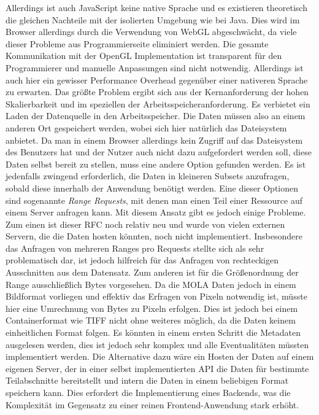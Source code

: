 Allerdings ist auch JavaScript keine native Sprache und es existieren theoretisch die gleichen Nachteile mit der isolierten Umgebung wie bei Java. Dies wird im Browser allerdings durch die Verwendung von WebGL abgeschwächt, da viele dieser Probleme aus Programmierseite eliminiert werden. Die gesamte Kommunikation mit der OpenGL Implementation ist transparent für den Programmierer und manuelle Anpassungen sind nicht notwendig. Allerdings ist auch hier ein gewisser Performance Overhead gegenüber einer nativeren Sprache zu erwarten. Das größte Problem ergibt sich aus der Kernanforderung der hohen Skalierbarkeit und im speziellen der Arbeitsspeicheranforderung. Es verbietet ein Laden der Datenquelle in den Arbeitsspeicher. Die Daten müssen also an einem anderen Ort gespeichert werden, wobei sich hier natürlich das Dateisystem anbietet. Da man in einem Browser allerdings kein Zugriff auf das Dateisystem des Benutzers hat und der Nutzer auch nicht dazu aufgefordert werden soll, diese Daten selbst bereit zu stellen, muss eine andere Option gefunden werden. Es ist jedenfalls zwingend erforderlich, die Daten in kleineren Subsets anzufragen, sobald diese innerhalb der Anwendung benötigt werden. Eine dieser Optionen sind sogenannte \textit{Range Requests}\cite{rangeRequestRfc}, mit denen man einen Teil einer Ressource auf einem Server anfragen kann. Mit diesem Ansatz gibt es jedoch einige Probleme. Zum einen ist dieser RFC noch relativ neu und wurde von vielen externen Servern, die die Daten hosten könnten, noch nicht implementiert. Insbesondere das Anfragen von mehreren Ranges pro Requests stellte sich als sehr problematisch dar, ist jedoch hilfreich für das Anfragen von rechteckigen Ausschnitten aus dem Datensatz. Zum anderen ist für die Größenordnung der Range ausschließlich Bytes vorgesehen. Da die MOLA Daten jedoch in einem Bildformat vorliegen und effektiv das Erfragen von Pixeln notwendig ist, müsste hier eine Umrechnung von Bytes zu Pixeln erfolgen. Dies ist jedoch bei einem Containerformat wie TIFF nicht ohne weiteres möglich, da die Daten keinem einheitlichen Format folgen. Es könnten in einem ersten Schritt die Metadaten ausgelesen werden, dies ist jedoch sehr komplex und alle Eventualitäten müssten implementiert werden. Die Alternative dazu wäre ein Hosten der Daten auf einem eigenen Server, der in einer selbst implementierten API die Daten für bestimmte Teilabschnitte bereitstellt und intern die Daten in einem beliebigen Format speichern kann. Dies erfordert die Implementierung eines Backends, was die Komplexität im Gegensatz zu einer reinen Frontend-Anwendung stark erhöht.


